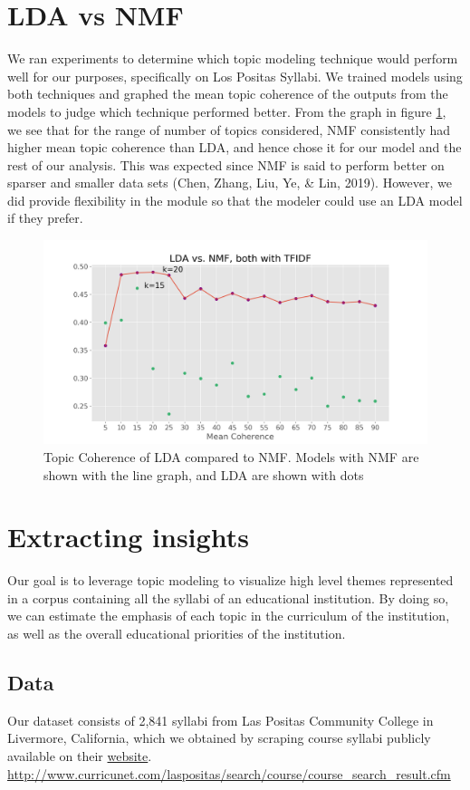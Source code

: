 \section{LDA vs NMF}
We ran experiments to determine which topic modeling technique would perform well for our purposes, specifically on Los Positas Syllabi. We trained models using both techniques and graphed the mean topic coherence of the outputs from the models to judge which technique performed better. From the graph in figure \ref{fig:lda_vs_nmf}, we see that for the range of number of topics considered, NMF consistently had higher mean topic coherence than LDA, and hence chose it for our model and the rest of our analysis. This was expected since NMF is said to perform better on sparser and smaller data sets (Chen, Zhang, Liu, Ye, \& Lin, 2019). However, we did provide flexibility in the module so that the modeler could use an LDA model if they prefer. 
\begin{figure}[H]
    \centering
    \includegraphics[scale=0.15]{LDAvsNMF.png}
    \caption{Topic Coherence of LDA compared to NMF. Models with NMF are shown with the line graph, and LDA are shown with dots}
    \label{fig:lda_vs_nmf}
\end{figure}

\section{Extracting insights}
Our goal is to leverage topic modeling to visualize high level themes represented in a corpus containing all the syllabi of an educational institution. By doing so, we can estimate the emphasis of each topic in the curriculum of the institution, as well as the overall educational priorities of the institution.

\subsection{Data}
Our dataset consists of 2,841 syllabi from Las Positas Community College in Livermore, California, which we obtained by scraping course syllabi publicly available on their \href{http://www.curricunet.com/laspositas/search/course/course_search_result.cfm}{website}.
\url{http://www.curricunet.com/laspositas/search/course/course_search_result.cfm}

